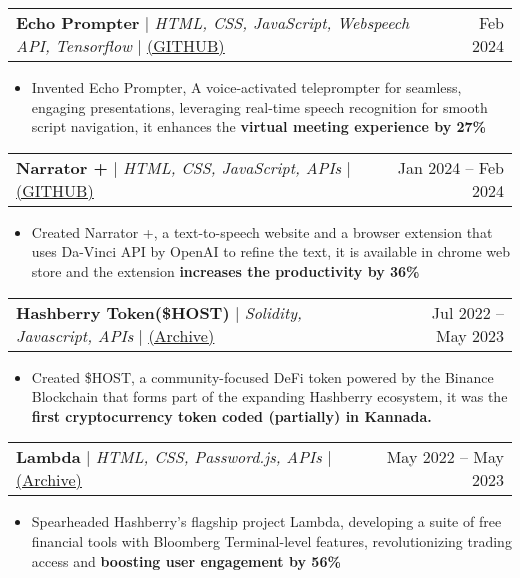 \documentclass[letterpaper,11pt]{article}
\makeatletter
\newcommand{\resumeItem}[1]{
  \item\small{
    {#1 \vspace{-2pt}}
  }
}
\newcommand{\resumeProjectHeading}[2]{
    \item
    \begin{tabular*}{0.97\textwidth}{l@{\extracolsep{\fill}}r}
      \small#1 & #2 \\
    \end{tabular*}\vspace{-7pt}
}
\newcommand{\resumeItemListStart}{\begin{itemize}}
\newcommand{\resumeItemListEnd}{\end{itemize}\vspace{-5pt}}
\makeatother
\begin{document}
\resumeProjectHeading
          {\textbf{Echo Prompter} $|$ \emph{HTML, CSS, JavaScript, 
Webspeech API, Tensorflow} $|$ \href{https://github.com/sherwinvishesh/Echo-Prompter}{\underline{(GITHUB)}}}{Feb 2024}
          \resumeItemListStart
            \resumeItem{Invented Echo Prompter, A voice-activated teleprompter for seamless, engaging presentations, leveraging real-time speech recognition for smooth script navigation, it enhances the \textbf{virtual meeting experience by 27\% }}
            
            
\resumeItemListEnd





\resumeProjectHeading
          {\textbf{Narrator +} $|$ \emph{HTML, CSS, JavaScript, APIs} $|$ \href{https://github.com/sherwinvishesh/Narrator-Plus}{\underline{(GITHUB)}}}{Jan 2024 -- Feb 2024}
          \resumeItemListStart
            \resumeItem{Created Narrator +, a text-to-speech website and a browser extension that uses Da-Vinci API by OpenAI to refine
the text, it is available in chrome web store and the extension \textbf{increases the productivity by 36\%}}
            
            
\resumeItemListEnd





          \resumeProjectHeading
          {\textbf{Hashberry Token(\$HOST) } $|$ \emph{Solidity, Javascript, APIs} $|$ \href{https://archive1-hashberry-technologies.sherwinvishesh.com/hashberry-token/}{\underline{(Archive)}} }{Jul 2022 – May 2023}
          \resumeItemListStart
            \resumeItem{Created \$HOST, a community-focused DeFi token powered by the Binance Blockchain that forms part of the expanding Hashberry ecosystem,
it was the \textbf{first cryptocurrency token coded (partially) in Kannada.}}
            
            
\resumeItemListEnd

          
\resumeProjectHeading
          {\textbf{Lambda } $|$ \emph{HTML, CSS, Password.js, APIs } $|$ \href{https://archive1-hashberry-technologies.sherwinvishesh.com/lambda/}{\underline{(Archive)}}}{May 2022 – May 2023}
          \resumeItemListStart
            \resumeItem{Spearheaded Hashberry’s flagship project Lambda, developing a suite of free financial tools with Bloomberg
Terminal-level features, revolutionizing trading access and \textbf{boosting user engagement by 56\%}}
            
            
\resumeItemListEnd
\end{document}
